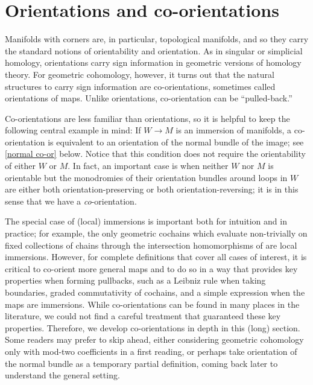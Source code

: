
\section{Orientations and co-orientations}\label{S: orientations and co-orientations}

Manifolds with corners are, in particular, topological manifolds, and so they carry the standard notions of orientability and orientation.
As in singular or simplicial homology, orientations carry sign information in geometric versions of homology theory.
For geometric cohomology, however, it turns out that the natural structures to carry sign information are co-orientations, sometimes called orientations of maps.
Unlike orientations, co-orientation can be ``pulled-back.''

Co-orientations are less familiar than orientations, so it is helpful to keep the following central example in mind: If $W\to M$ is an immersion of manifolds, a co-orientation is equivalent to an orientation of the normal bundle of the image; see \cref{normal co-or} below.
Notice that this condition does not require the orientability of either $W$ or $M$.
In fact, an important case is when neither $W$ nor $M$ is orientable but the monodromies of their orientation bundles around loops in $W$ are either both orientation-preserving or both orientation-reversing; it is in this sense that we have a {\it co}-orientation.

The special case of (local) immersions is important both for intuition and in practice; for example, the only geometric cochains which evaluate non-trivially on fixed collections of chains through the intersection homomorphisms of \cite{FMS-flows} are local immersions.
However, for complete definitions that cover all cases of interest, it is critical to co-orient more general maps and to do so in a way that provides key properties when forming pullbacks, such as a Leibniz rule when taking boundaries, graded commutativity of cochains, and a simple expression when the maps are immersions.
While co-orientations can be found in many places in the literature, we could not find a careful treatment that guaranteed these key properties.
Therefore, we develop co-orientations in depth in this (long) section.
Some readers may prefer to skip ahead, either considering geometric cohomology only with mod-two coefficients in a first reading, or perhaps take orientation of the normal bundle as a temporary partial definition, coming back later to understand the general setting.

